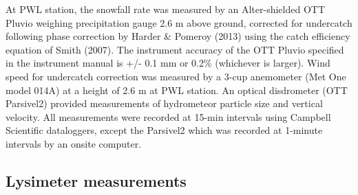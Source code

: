 \documentclass[
  letterpaper,
  DIV=11,
  numbers=noendperiod]{scrartcl}
\begin{document}
At PWL station, the snowfall rate was measured by an Alter-shielded OTT
Pluvio weighing precipitation gauge 2.6 m above ground, corrected for
undercatch following phase correction by Harder \& Pomeroy (2013) using
the catch efficiency equation of Smith (2007). The instrument accuracy
of the OTT Pluvio specified in the instrument manual is +/- 0.1 mm or
0.2\% (whichever is larger). Wind speed for undercatch correction was
measured by a 3-cup anemometer (Met One model 014A) at a height of 2.6 m
at PWL station. An optical disdrometer (OTT Parsivel2) provided
measurements of hydrometeor particle size and vertical velocity. All
measurements were recorded at 15-min intervals using Campbell Scientific
dataloggers, except the Parsivel2 which was recorded at 1-minute
intervals by an onsite computer.

\subsection{Lysimeter measurements}\label{lysimeter-measurements}
\end{document}
